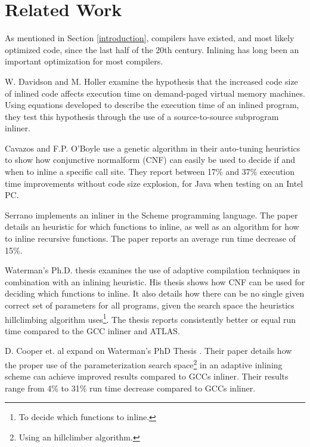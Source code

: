 
\clearpage
\section{Related Work}

As mentioned in Section \ref{introduction}, compilers have existed, and most
likely optimized code, since the last half of the 20th century. Inlining has
long been an important optimization for most compilers.

W. Davidson and M. Holler \cite{SubprogInlining} examine the hypothesis that the
increased code size of inlined code affects execution time on demand-paged
virtual memory machines. Using equations developed to describe the execution
time of an inlined program, they test this hypothesis through the use of a
source-to-source subprogram inliner.

Cavazos and F.P. O'Boyle \cite{AutoTuningJavaHeuristics} use a genetic algorithm
in their auto-tuning heuristics to show how conjunctive normalform (CNF) can
easily be used to decide if and when to inline a specific call site. They report
between 17\% and 37\% execution time improvements without code size explosion,
for Java when testing on an Intel PC.

Serrano \cite{InlineWhenHowSerrano} implements an inliner in the Scheme
programming language. The paper details an heuristic for which functions to
inline, as well as an algorithm for how to inline recursive functions. The paper
reports an average run time decrease of 15\%.


Waterman's Ph.D. thesis \cite{AdaptvCompilAndInlingWaterman} examines the use of
adaptive compilation techniques in combination with an inlining heuristic. His
thesis shows how CNF can be used for deciding which functions to inline. It also
details how there can be no single given correct set of parameters for all
programs, given the search space the heuristics hillclimbing algorithm
uses\footnote{To decide which functions to inline.}. The thesis reports
consistently better or equal run time compared to the GCC inliner and ATLAS.

D. Cooper et. al \cite{AdaptvStratInlSubst} expand on Waterman's PhD Thesis
\cite{AdaptvCompilAndInlingWaterman}. Their paper details how the proper use of
the parameterization search space\footnote{Using an hillclimber algorithm.} in
an adaptive inlining scheme can achieve improved results compared to GCCs
inliner. Their results range from 4\% to 31\% run time decrease compared to GCCs
inliner.

